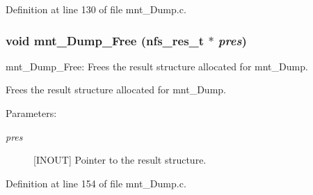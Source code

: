 Definition at line 130 of file mnt\_\-Dump.c.
\subsubsection{\setlength{\rightskip}{0pt plus 5cm}void mnt\_\-Dump\_\-Free (nfs\_\-res\_\-t $\ast$ {\em pres})}\label{mnt__Dump_8c_a1}


mnt\_\-Dump\_\-Free: Frees the result structure allocated for mnt\_\-Dump.

Frees the result structure allocated for mnt\_\-Dump.

\begin{Desc}
\item[Parameters:]
\begin{description}
\item[{\em pres}][INOUT] Pointer to the result structure. \end{description}
\end{Desc}


Definition at line 154 of file mnt\_\-Dump.c.